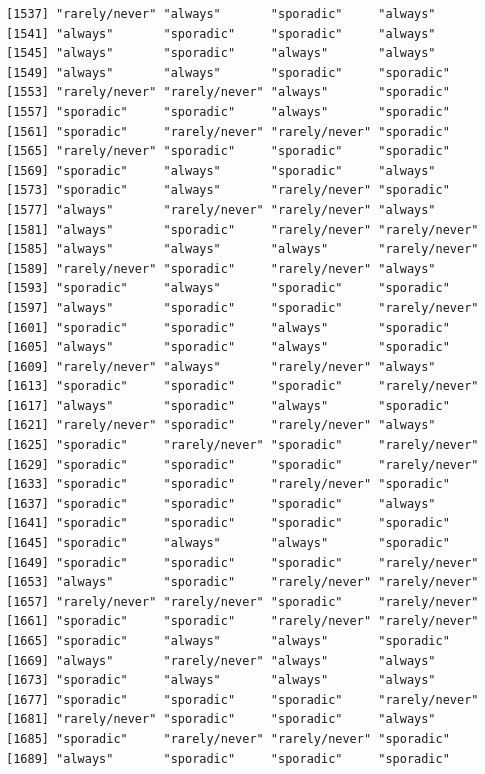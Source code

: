 \documentclass[
  letterpaper,
  DIV=11,
  numbers=noendperiod]{scrartcl}
\begin{document}
\begin{verbatim}
[1537] "rarely/never" "always"       "sporadic"     "always"      
[1541] "always"       "sporadic"     "sporadic"     "always"      
[1545] "always"       "sporadic"     "always"       "always"      
[1549] "always"       "always"       "sporadic"     "sporadic"    
[1553] "rarely/never" "rarely/never" "always"       "sporadic"    
[1557] "sporadic"     "sporadic"     "always"       "sporadic"    
[1561] "sporadic"     "rarely/never" "rarely/never" "sporadic"    
[1565] "rarely/never" "sporadic"     "sporadic"     "sporadic"    
[1569] "sporadic"     "always"       "sporadic"     "always"      
[1573] "sporadic"     "always"       "rarely/never" "sporadic"    
[1577] "always"       "rarely/never" "rarely/never" "always"      
[1581] "always"       "sporadic"     "rarely/never" "rarely/never"
[1585] "always"       "always"       "always"       "rarely/never"
[1589] "rarely/never" "sporadic"     "rarely/never" "always"      
[1593] "sporadic"     "always"       "sporadic"     "sporadic"    
[1597] "always"       "sporadic"     "sporadic"     "rarely/never"
[1601] "sporadic"     "sporadic"     "always"       "sporadic"    
[1605] "always"       "sporadic"     "always"       "sporadic"    
[1609] "rarely/never" "always"       "rarely/never" "always"      
[1613] "sporadic"     "sporadic"     "sporadic"     "rarely/never"
[1617] "always"       "sporadic"     "always"       "sporadic"    
[1621] "rarely/never" "sporadic"     "rarely/never" "always"      
[1625] "sporadic"     "rarely/never" "sporadic"     "rarely/never"
[1629] "sporadic"     "sporadic"     "sporadic"     "rarely/never"
[1633] "sporadic"     "sporadic"     "rarely/never" "sporadic"    
[1637] "sporadic"     "sporadic"     "sporadic"     "always"      
[1641] "sporadic"     "sporadic"     "sporadic"     "sporadic"    
[1645] "sporadic"     "always"       "always"       "sporadic"    
[1649] "sporadic"     "sporadic"     "sporadic"     "rarely/never"
[1653] "always"       "sporadic"     "rarely/never" "rarely/never"
[1657] "rarely/never" "rarely/never" "sporadic"     "rarely/never"
[1661] "sporadic"     "sporadic"     "rarely/never" "rarely/never"
[1665] "sporadic"     "always"       "always"       "sporadic"    
[1669] "always"       "rarely/never" "always"       "always"      
[1673] "sporadic"     "always"       "always"       "always"      
[1677] "sporadic"     "sporadic"     "sporadic"     "rarely/never"
[1681] "rarely/never" "sporadic"     "sporadic"     "always"      
[1685] "sporadic"     "rarely/never" "rarely/never" "sporadic"    
[1689] "always"       "sporadic"     "sporadic"     "sporadic"    

\end{verbatim}
\end{document}
